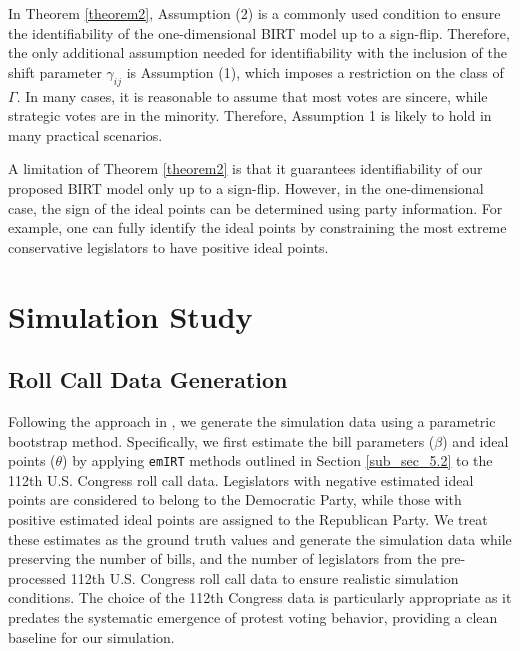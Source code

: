 \documentclass[11pt]{article}
\begin{document}
In Theorem \ref{theorem2}, Assumption (2) is a commonly used condition to ensure the identifiability of the one-dimensional BIRT model up to a sign-flip. Therefore, the only additional assumption needed for identifiability with the inclusion of the shift parameter $ \gamma_{ij} $ is Assumption (1), which imposes a restriction on the class of $ \Gamma $. In many cases, it is reasonable to assume that most votes are sincere, while strategic votes are in the minority. Therefore, Assumption 1 is likely to hold in many practical scenarios.

A limitation of Theorem \ref{theorem2} is that it guarantees identifiability of our proposed BIRT model only up to a sign-flip. However, in the one-dimensional case, the sign of the ideal points can be determined using party information. For example, one can fully identify the ideal points by constraining the most extreme conservative legislators to have positive ideal points.  
  



\section{Simulation Study}\label{sec_5}
\subsection{Roll Call Data Generation}
Following the approach in \cite{Imai2016}, we generate the simulation data using a parametric bootstrap method. Specifically, we first estimate the bill parameters ($ \beta $) and ideal points ($ \theta $) by applying \texttt{emIRT} methods outlined in Section \ref{sub_sec_5.2} to the 112th U.S. Congress roll call data. Legislators with negative estimated ideal points are considered to belong to the Democratic Party, while those with positive estimated ideal points are assigned to the Republican Party. We treat these estimates as the ground truth values and generate the simulation data while preserving the number of bills, and the number of legislators from the pre-processed 112th U.S. Congress roll call data to ensure realistic simulation conditions. The choice of the 112th Congress data is particularly appropriate as it predates the systematic emergence of protest voting behavior, providing a clean baseline for our simulation. 
\end{document}
